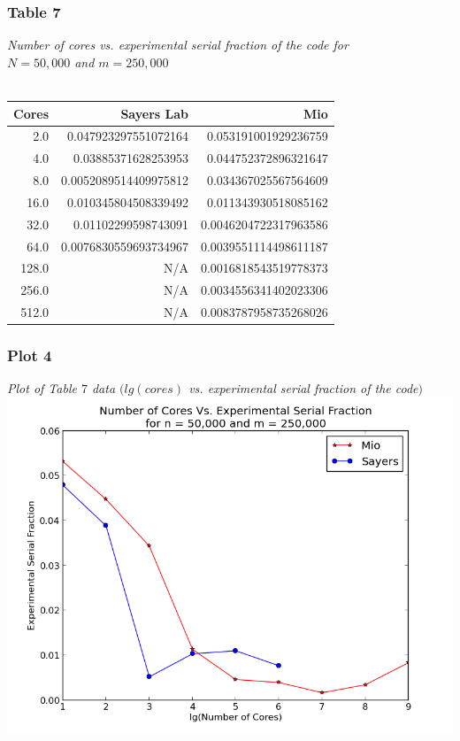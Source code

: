 \documentclass[letterpaper, 12pt]{article}
\begin{document}
	\subsubsection*{Table 7} \small\textit{Number of cores vs. experimental serial fraction of the code for\\ $N=50,000$ and $m=250,000$} \\\\
	\normalsize
	\begin{tabular}{r||r|r}
	\hline
		Cores              &Sayers Lab                     &Mio \\ 
	\hline
		  2.0    &0.047923297551072164    &0.053191001929236759 \\ 
		  4.0     &0.03885371628253953    &0.044752372896321647 \\ 
		  8.0   &0.0052089514409975812    &0.034367025567564609 \\ 
		 16.0    &0.010345804508339492    &0.011343930518085162 \\ 
		 32.0     &0.01102299598743091   &0.0046204722317963586 \\ 
		 64.0   &0.0076830559693734967   &0.0039551114498611187 \\ 
		128.0                     &N/A   &0.0016818543519778373 \\ 
		256.0                     &N/A   &0.0034556341402023306 \\ 
		512.0                     &N/A   &0.0083787958735268026 \\ 
		\hline
	\end{tabular}
	
	\subsubsection*{Plot 4} \small\textit{Plot of Table $7$ data $(lg(cores)$ vs. experimental serial fraction of the code$)$} \\
	\normalsize
	\includegraphics[width=.75\linewidth]{ProjectFiles/results/plots/coresVexpserialfrac.png}
	
\end{document}
